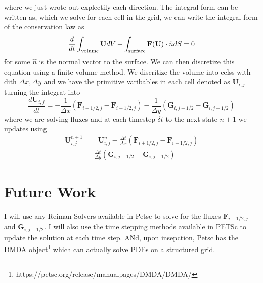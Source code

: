 \documentclass[12pt]{article}
\begin{document}
where we just wrote out explectily each direction. The integral form can be written as, which we solve for each cell in the grid, we can write the integral form of the conservation law as
\begin{equation}
    \dfrac{d}{dt} \int_{\rm volume} \mathbf{U} dV + \int_{\rm surface} \mathbf{F}(\mathbf{U}) \cdot \hat{n} dS = 0
\end{equation}
for some $\hat{n}$ is the normal vector to the surface. We can then discretize this equation using a finite volume method. We discritize the volume into celss with dith $\Delta x, \Delta y$ and we have the primitive varibables in each cell denoted as $\mathbf{U}_{i,j}$ turning the integrat into 
\begin{equation}
\frac{d \mathbf{U}_{i,j}}{dt} = - \frac{1}{\Delta x} (\mathbf{F}_{i+1/2, j} - \mathbf{F}_{i-1/2, j}) - \frac{1}{\Delta y} (\mathbf{G}_{i, j+1/2} - \mathbf{G}_{i, j-1/2})
\end{equation}
where we are solving fluxes and at each timestep $\delta t$ to the next state $n+1$ we updates using 
\begin{align*}
\mathbf{U}_{i,j}^{n+1} &= \mathbf{U}_{i,j}^n  - \frac{\Delta t}{\Delta x}(\mathbf{F}_{i+1/2, j} - \mathbf{F}_{i-1/2, j})\\
&- \frac{\Delta t}{\Delta y} (\mathbf{G}_{i, j+1/2} - \mathbf{G}_{i, j-1/2})
\end{align*}

\section{Future Work}
I will use any Reiman Solvers available in Petsc to solve for the fluxes $\mathbf{F}_{i+1/2, j}$ and $\mathbf{G}_{i, j+1/2}$. I will also use the time stepping methods available in PETSc to update the solution at each time step. ANd, upon insepction, Petsc has the DMDA object\footnote{https://petsc.org/release/manualpages/DMDA/DMDA/} which can actually solve PDEs on a structured grid.
\end{document}
